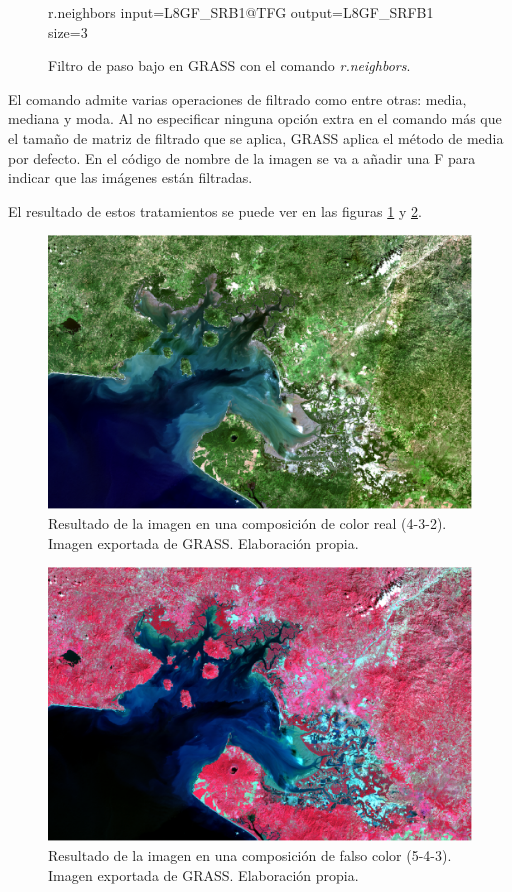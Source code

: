 \begin{figure}[ht]
\centering
\begin{boxedverbatim}
	r.neighbors input=L8GF_SRB1@TFG output=L8GF_SRFB1 size=3
\end{boxedverbatim}
\caption[Filtro de paso bajo]{Filtro de paso bajo en GRASS con el comando \textit{r.neighbors}.}
\end{figure}

El comando admite varias operaciones de filtrado como entre otras: media, mediana y moda. Al no especificar ninguna opción extra en el comando más que el tamaño de matriz de filtrado que se aplica, GRASS aplica el método de media por defecto. En el código de nombre de la imagen se va a añadir una F para indicar que las imágenes están filtradas.

El resultado de estos tratamientos se puede ver en las figuras \ref{fig:gf432} y \ref{fig:gf543}.
\begin{figure}
	\centering
	\includegraphics[width=0.9\linewidth]{./Imagenes/GF432.eps}
	\caption[Composición en color real]{Resultado de la imagen en una composición de color real (4-3-2). Imagen exportada de GRASS. Elaboración propia.}
	\label{fig:gf432}
\end{figure}

\begin{figure}
	\centering
	\includegraphics[width=0.9\linewidth]{./Imagenes/GF543.eps}
	\caption[Composición en falso color]{Resultado de la imagen en una composición de falso color (5-4-3). Imagen exportada de GRASS. Elaboración propia.}
	\label{fig:gf543}
\end{figure}

